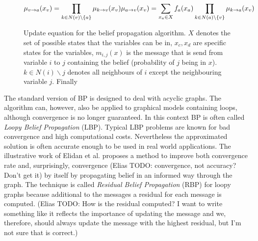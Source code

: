 \begin{figure}
\label{eqn:bp_message}
\begin{equation*}                                                            
\mu_{v\rightarrow a}(x_v) = \prod_{k \in N(v)\backslash \{a\}} \mu_{k\rightarrow v}(x_v)\\
\mu_{a\rightarrow v}(x_v) = \sum_{x_a \in X}f_a(x_a) \prod_{k \in N(a)\backslash \{v\}} \mu_{k\rightarrow a}(x_v)
\end{equation*}
\caption{Update equation for the belief propagation algorithm. $X$ denotes the set of possible states that the variables can be in, $x_c, x_d$ are specific states for the variables, $m_{i,j}(x)$ is the message that is send from variable $i$ to $j$ containing the belief (probability of $j$ being in $x$). $k \in N(i)\backslash j$ denotes all neighbours of $i$ except the neighbouring variable $j$. Finally }
\end{figure}


The standard version of BP is designed to deal with acyclic graphs. The algorithm can, however, also be applied to graphical models containing loops, although convergence is no longer guaranteed. In this context BP is often called \textit{Loopy Belief Propagation} (LBP). Typical LBP problems are known for bad convergence and high computational costs. Nevertheless the approximated solution is often accurate enough to be used in real world applications. The illustrative work of Elidan et al. \cite{elidan2012residual} proposes a method to improve both convergence rate and, surprisingly, convergence (Elias TODO: convergence, not accuracy? Don't get it) by itself by propagating belief in an informed way through the graph. The technique is called \textit{Residual Belief Propagation} (RBP) for loopy graphs because additional to the messages a residual for each message is computed.
(Elias TODO: How is the residual computed? I want to write something like it reflects the importance of updating the message and we, therefore, should always update the message with the highest residual, but I'm not sure that is correct.)


